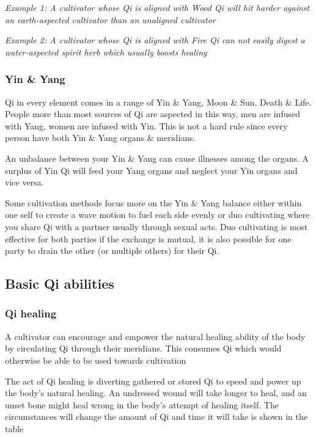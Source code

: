\textit{Example 1: A cultivator whose Qi is aligned with Wood Qi will hit harder against an earth-aspected cultivator than an unaligned cultivator}

\textit{Example 2: A cultivator whose Qi is aligned with Fire Qi can not easily digest a water-aspected spirit herb which usually boosts healing}

\subsubsection{Yin \& Yang}

Qi in every element comes in a range of Yin \& Yang, Moon \& Sun, Death \& Life. People more than most sources of Qi are aspected in this way, men are infused with Yang, 
women are infused with Yin. This is not a hard rule since every person have both Yin \& Yang organs \& meridians. 

An unbalance between your Yin \& Yang can cause illnesses among the organs. A surplus of Yin Qi will feed your Yang organs and neglect your Yin organs and vice versa. 

Some cultivation methods focus more on the Yin \& Yang balance either within one self to create a wave motion to fuel each side evenly or 
duo cultivating where you share Qi with a partner usually through sexual acts. Duo cultivating is most effective for both parties if the exchange is mutual, it is also 
possible for one party to drain the other (or multiple others) for their Qi.

\subsection{Basic Qi abilities}

\subsubsection{Qi healing}
A cultivator can encourage and empower the natural healing ability of the body by circulating Qi through their meridians. 
This consumes Qi which would otherwise be able to be used towards cultivation

The act of Qi healing is diverting gathered or stored Qi to speed and power up the body’s natural healing. An undressed wound will take longer to heal, and an unset bone might heal wrong in the body’s attempt of healing itself. 
The circumstances will change the amount of Qi and time it will take is shown in the table

